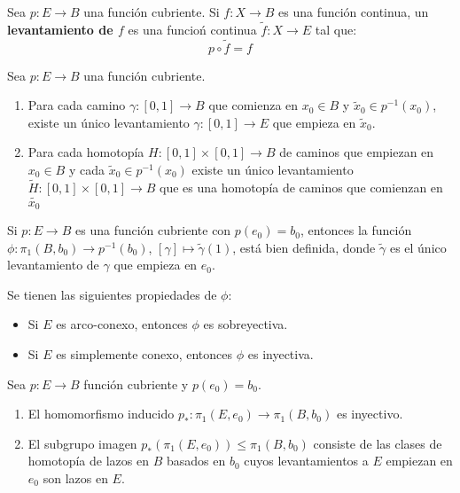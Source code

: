 \documentclass[12pt]{report}
\newcounter{it}
\theoremstyle{largebreak}
\newcommand\cf[3]{\ensuremath{#1:#2\rightarrow#3}}
\begin{document}
    \begin{mydef}
        Sea $\cf{p}{E}{B}$ una función cubriente. Si $\cf{f}{X}{B}$ es una función continua, un \textbf{levantamiento de $f$} es una funcioń continua $\cf{\widetilde{f}}{X}{E}$ tal que:
        \begin{equation*}
            p\circ\widetilde{f}=f
        \end{equation*}
    \end{mydef}

    \begin{theor}
        Sea $\cf{p}{E}{B}$ una función cubriente.
        \begin{enumerate}
            \item Para cada camino $\cf{\gamma}{[0,1]}{B}$ que comienza en $x_0\in B$ y $\widetilde{x}_0\in p^{-1}(x_0)$, existe un único levantamiento $\cf{\gamma}{[0,1]}{E}$ que empieza en $\widetilde{x}_0$.
            \item Para cada homotopía $\cf{H}{[0,1]\times[0,1]}{B}$ de caminos que empiezan en $x_0\in B$ y cada $\widetilde{x}_0\in p^{-1}(x_0)$ existe un único levantamiento $\cf{\widetilde{H}}{[0,1]\times[0,1]}{B}$ que es una homotopía de caminos que comienzan en $\widetilde{x_0}$
        \end{enumerate}
    \end{theor}

    Si $\cf{p}{E}{B}$ es una función cubriente con $p(e_0)=b_0$, entonces la función $\cf{\phi}{\pi_1(B,b_0)}{p^{-1}(b_0)}$, $[\gamma]\mapsto\widetilde{\gamma}(1)$, está bien definida, donde $\widetilde{\gamma}$ es el único levantamiento de $\gamma$ que empieza en $e_0$.

    \begin{theor}
        Se tienen las siguientes propiedades de $\phi$:
        \begin{itemize}
            \item Si $E$ es arco-conexo, entonces $\phi$ es sobreyectiva.
            \item Si $E$ es simplemente conexo, entonces $\phi$ es inyectiva.
        \end{itemize}
    \end{theor}

    \begin{propo}
        Sea $\cf{p}{E}{B}$ función cubriente y $p(e_0)=b_0$.
        \begin{enumerate}
            \item El homomorfismo inducido $\cf{p_*}{\pi_1(E,e_0)}{\pi_1(B,b_0)}$ es inyectivo.
            \item El subgrupo imagen $p_{*}\left(\pi_1(E,e_0) \right)\leq\pi_1(B,b_0)$ consiste de las clases de homotopía de lazos en $B$ basados en $b_0$ cuyos levantamientos a $E$ empiezan en $e_0$ son lazos en $E$.
        \end{enumerate}
    \end{propo}
\end{document}
